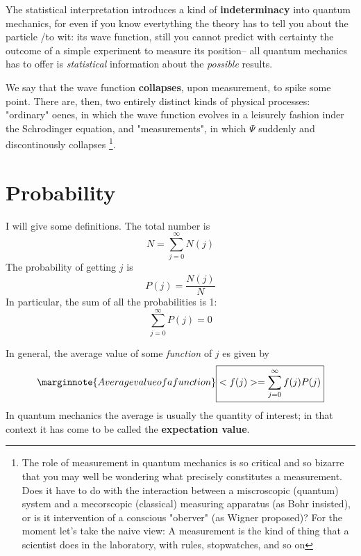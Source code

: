 Yhe statistical interpretation introduces a kind of \textbf{indeterminacy} into quantum mechanics, for even if you know evertything the theory has to tell you about the particle /to wit: its wave function, still you cannot predict with certainty the outcome of a simple experiment to measure its position-- all quantum mechanics has to offer is \textit{statistical} information about the \textit{possible} results.

We say that the wave function \textbf{collapses}, upon measurement, to spike some point. There are, then, two entirely distinct kinds of physical processes: "ordinary" oenes, in which the wave function evolves in a leisurely fashion inder the Schrodinger equation, and "measurements", in which $\Psi$ suddenly and discontinously collapses \footnote{The role of measurement in quantum mechanics is so critical and so bizarre that you may well be wondering what precisely constitutes a measurement. Does it have to do with the interaction between a miscroscopic (quantum) system and a mecorscopic (classical) measuring apparatus (as Bohr insisted), or is it intervention of a conscious "oberver" (as Wigner proposed)? For the moment let's take the naive view: A measurement is the kind of thing that a scientist does in the laboratory, with rules, stopwatches, and so on}.

\section{Probability}
I will give some definitions. The total number is  
\begin{equation}\label{1.4}
	N = \sum_{j=0}^\infty N(j)
\end{equation}
The probability of getting $j$ is
\begin{equation}\label{1.5}
	P(j)=\frac{N(j)}{N}
\end{equation}
In particular, the sum of all the probabilities is 1:
\begin{equation}\label{1.6}
	\sum_{j=0}^\infty P(j)=0
\end{equation}


In general, the average value of some \textit{function} of $j$ es given by
\begin{equation}\label{1.9}\marginnote{Average value of a function}
	\boxed{<f(j)>=\sum_{j=0}^\infty f(j)P(j)}
\end{equation}
In quantum mechanics the average is usually the quantity of interest; in that context it has come to be called the \textbf{expectation value}.

